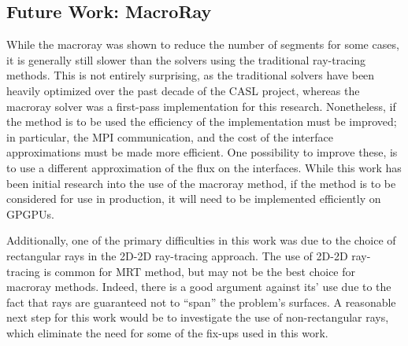 {{    \subsection{Future Work: MacroRay}{\label{ssec:Future Work:MacroRay}
      While the macroray was shown to reduce the number of segments for some cases, it is generally still slower than the solvers using the traditional ray-tracing methods.
      This is not entirely surprising, as the traditional solvers have been heavily optimized over the past decade of the \ac{CASL} project, whereas the macroray solver was a first-pass implementation for this research.
      Nonetheless, if the method is to be used the efficiency of the implementation must be improved; in particular, the MPI communication, and the cost of the interface approximations must be made more efficient.
      One possibility to improve these, is to use a different approximation of the flux on the interfaces.
      While this work has been initial research into the use of the macroray method, if the method is to be considered for use in production, it will need to be implemented efficiently on \acp{GPGPU}.

      Additionally, one of the primary difficulties in this work was due to the choice of rectangular rays in the 2D-2D ray-tracing approach.
      The use of 2D-2D ray-tracing is common for \ac{MRT} method, but may not be the best choice for macroray methods.
      Indeed, there is a good argument against its' use due to the fact that rays are guaranteed not to ``span'' the problem's surfaces.
      A reasonable next step for this work would be to investigate the use of non-rectangular rays, which eliminate the need for some of the fix-ups used in this work.
    }
  }

  \printbibliography
}